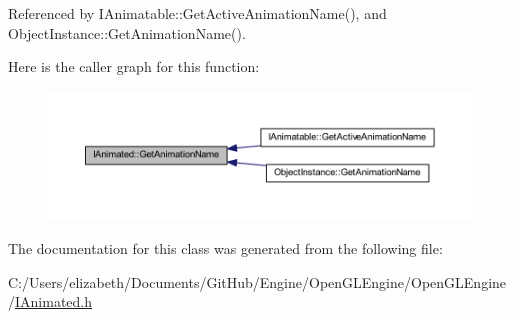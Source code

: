 Referenced by I\+Animatable\+::\+Get\+Active\+Animation\+Name(), and Object\+Instance\+::\+Get\+Animation\+Name().



Here is the caller graph for this function\+:\nopagebreak
\begin{figure}[H]
\begin{center}
\leavevmode
\includegraphics[width=350pt]{class_i_animated_a4840f3a1bbcc5e0050bdb0dde1191704_icgraph}
\end{center}
\end{figure}




The documentation for this class was generated from the following file\+:\begin{DoxyCompactItemize}
\item 
C\+:/\+Users/elizabeth/\+Documents/\+Git\+Hub/\+Engine/\+Open\+G\+L\+Engine/\+Open\+G\+L\+Engine/\hyperlink{_i_animated_8h}{I\+Animated.\+h}\end{DoxyCompactItemize}
